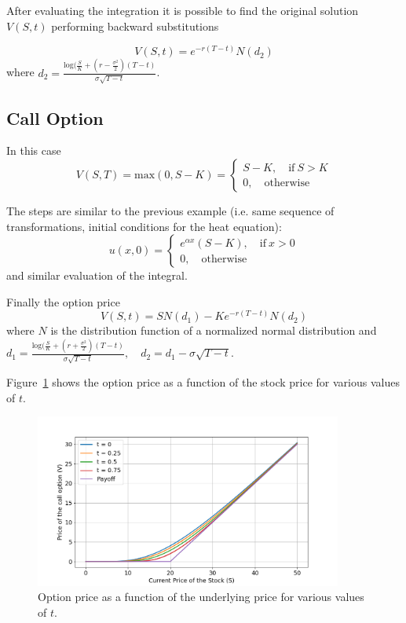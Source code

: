 After evaluating the integration it is possible to find the original solution $V(S,t)$ performing backward substitutions

\begin{equation}
V(S, t) = e^{-r(T-t)}N(d_2)
\end{equation}
where $d_2=\frac{\textrm{log}(\frac{S}{K}+\left(r-\frac{\sigma^2}{2}\right)(T-t)}{\sigma\sqrt{T-t}}$.

\subsection{Call Option}
In this case
\begin{equation}
V(S,T)=\textrm{max}(0,S-K)=
\begin{cases}
S-K,\quad \textrm{if}~S>K\\
0, \quad\textrm{otherwise}
\end{cases}
\end{equation}

The steps are similar to the previous example (i.e. same sequence of transformations, initial conditions for the heat equation):
\begin{equation}
u(x,0)=
\begin{cases}
e^{\alpha x}(S-K),\quad \textrm{if}~x>0\\
0, \quad\textrm{otherwise}
\end{cases}
\end{equation}
and similar evaluation of the integral.

Finally the option price
\begin{equation}
V(S,t) = SN(d_1)-Ke^{-r(T-t)}N(d_2)
\end{equation}
where $N$ is the distribution function of a normalized normal distribution and  $d_1=\frac{\textrm{log}(\frac{S}{K}+\left(r+\frac{\sigma^2}{2}\right)(T-t)}{\sigma\sqrt{T-t}},\quad d_2=d_1-\sigma\sqrt{T-t}$.

Figure~\ref{fig:call_option} shows the option price as a function of the stock price for various values of $t$.

\begin{figure}[htb]
	\centering
	\includegraphics[width=0.9\textwidth]{figures/call_option_price}
	\caption{Option price as a function of the underlying price for various values of $t$.}
	\label{fig:call_option}
\end{figure} 

